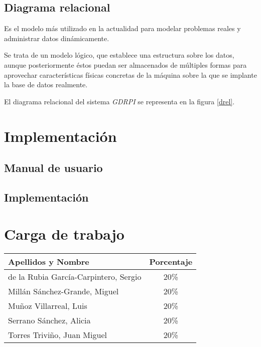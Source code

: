 \documentclass[11pt,a4paper,spanish,twoside]{book}
\begin{document}
\begin{sidewaystable}
\end{sidewaystable}

\section{Diagrama relacional}
Es el modelo más utilizado en la actualidad para modelar problemas reales y 
administrar datos dinámicamente.

Se trata de un modelo lógico, que establece una estructura sobre los datos,
aunque posteriormente éstos puedan ser almacenados de múltiples formas para
aprovechar características físicas concretas de la máquina sobre la que se
implante la base de datos realmente.

El diagrama relacional del sistema \emph{GDRPI} se representa en la figura
\ref{drel}. 

\chapter{Implementación}

\section{Manual de usuario}

\section{Implementación}

\appendix
\chapter{Carga de trabajo}
\begin{center}
  \begin{tabular}{p{10cm}|c}
    \textbf{Apellidos y Nombre} & \textbf{Porcentaje} \\ \hline \hline
    de la Rubia García-Carpintero, Sergio & 20\% \\
    Millán Sánchez-Grande, Miguel         & 20\% \\ 
    Muñoz Villarreal, Luis                & 20\% \\ 
    Serrano Sánchez, Alicia               & 20\% \\ 
    Torres Triviño, Juan Miguel           & 20\% \\
  \end{tabular}
\end{center}
\end{document}

